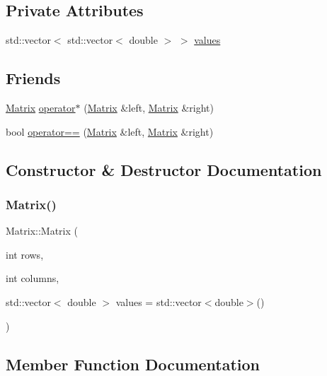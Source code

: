 \subsection*{Private Attributes}
\begin{DoxyCompactItemize}
\item 
std\+::vector$<$ std\+::vector$<$ double $>$ $>$ \hyperlink{classMatrix_a5987175ae045377790ff0b1f6cfd2e7b}{values}
\end{DoxyCompactItemize}
\subsection*{Friends}
\begin{DoxyCompactItemize}
\item 
\hyperlink{classMatrix}{Matrix} \hyperlink{classMatrix_ac50600b8a22de241095a6d5fd075acc5}{operator$\ast$} (\hyperlink{classMatrix}{Matrix} \&left, \hyperlink{classMatrix}{Matrix} \&right)
\item 
bool \hyperlink{classMatrix_a9407333bda2f3bf7b8a7ca9bec61b8ce}{operator==} (\hyperlink{classMatrix}{Matrix} \&left, \hyperlink{classMatrix}{Matrix} \&right)
\end{DoxyCompactItemize}


\subsection{Constructor \& Destructor Documentation}
\mbox{\label{classMatrix_a5d39846f7d1e7f2f0ca9cb49117221e1}} 
\subsubsection{\texorpdfstring{Matrix()}{Matrix()}}
{\footnotesize\ttfamily Matrix\+::\+Matrix (\begin{DoxyParamCaption}\item[{int}]{rows,  }\item[{int}]{columns,  }\item[{std\+::vector$<$ double $>$}]{values = {\ttfamily std\+:\+:vector$<$double$>$()} }\end{DoxyParamCaption})}



\subsection{Member Function Documentation}
\mbox{\label{classMatrix_a37d08315d9b28e5922e1a75b4d2a4cb9}} 
